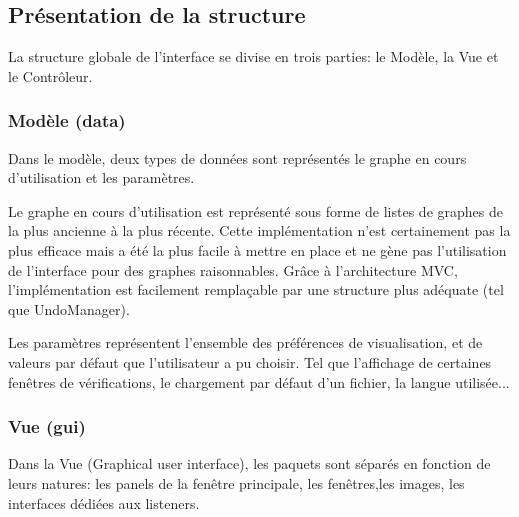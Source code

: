 \documentclass[french]{article}
\begin{document}
  \subsection{Présentation de la structure }
  La structure globale de l'interface se divise en trois parties: le Modèle, la Vue et le Contrôleur.


  \subsubsection{Modèle (data)}

    Dans le modèle, deux types de données sont représentés le graphe en
    cours d'utilisation et les paramètres.

    Le graphe en cours d'utilisation est représenté sous forme de listes
    de graphes de la plus ancienne à la plus récente. Cette implémentation
    n'est certainement pas la plus efficace mais a été la plus facile
    à mettre en place et ne gène pas l'utilisation de l'interface pour
    des graphes raisonnables. Grâce à l'architecture MVC, l'implémentation
    est facilement remplaçable par une structure plus adéquate (tel que
    UndoManager).

    Les paramètres représentent l'ensemble des préférences de visualisation,
    et de valeurs par défaut que l'utilisateur a pu choisir. Tel que
    l'affichage de certaines fenêtres de vérifications, le chargement
    par défaut d'un fichier, la langue utilisée...


  \subsubsection{Vue (gui)}

    Dans la Vue (Graphical user interface), les paquets sont séparés en
    fonction de leurs natures: les panels de la fenêtre principale, les
    fenêtres,les images, les interfaces dédiées aux listeners.
\end{document}
